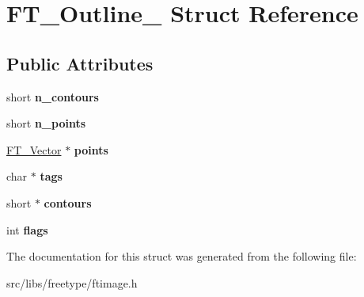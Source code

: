 \hypertarget{struct_f_t___outline__}{
\section{FT\_\-Outline\_\- Struct Reference}
\label{struct_f_t___outline__}
}
\subsection*{Public Attributes}
\begin{DoxyCompactItemize}
\item 
\hypertarget{struct_f_t___outline___a0313ba9c2c51f10e6b7d7ef97bd946e2}{
short {\bfseries n\_\-contours}}
\label{struct_f_t___outline___a0313ba9c2c51f10e6b7d7ef97bd946e2}

\item 
\hypertarget{struct_f_t___outline___a7ebcf3c33231af88655534d1ac02b66e}{
short {\bfseries n\_\-points}}
\label{struct_f_t___outline___a7ebcf3c33231af88655534d1ac02b66e}

\item 
\hypertarget{struct_f_t___outline___a4871896a2f38bdab947e30a7cf6bca04}{
\hyperlink{struct_f_t___vector__}{FT\_\-Vector} $\ast$ {\bfseries points}}
\label{struct_f_t___outline___a4871896a2f38bdab947e30a7cf6bca04}

\item 
\hypertarget{struct_f_t___outline___ac84ca66907361e1f49ec11c14720087a}{
char $\ast$ {\bfseries tags}}
\label{struct_f_t___outline___ac84ca66907361e1f49ec11c14720087a}

\item 
\hypertarget{struct_f_t___outline___a218fdea14003061142ac1045ac50affa}{
short $\ast$ {\bfseries contours}}
\label{struct_f_t___outline___a218fdea14003061142ac1045ac50affa}

\item 
\hypertarget{struct_f_t___outline___a149765f0be0eab4fc82410cf853964bf}{
int {\bfseries flags}}
\label{struct_f_t___outline___a149765f0be0eab4fc82410cf853964bf}

\end{DoxyCompactItemize}


The documentation for this struct was generated from the following file:\begin{DoxyCompactItemize}
\item 
src/libs/freetype/ftimage.h\end{DoxyCompactItemize}
